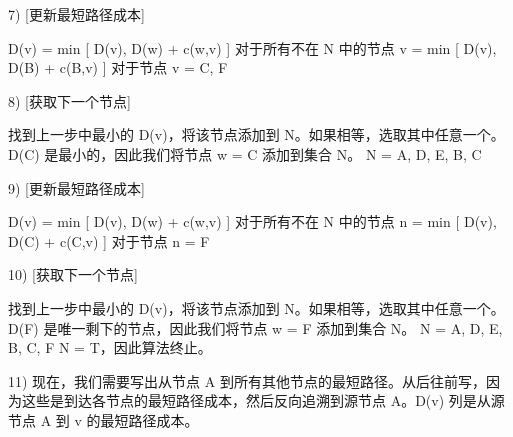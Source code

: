 \documentclass[oneside,UTF8]{ctexart}
\numberwithin{figure}{section} %
\begin{document}
7) [更新最短路径成本]

D(v) = min [ D(v), D(w) + c(w,v) ] 对于所有不在 N 中的节点 v
= min [ D(v), D(B) + c(B,v) ] 对于节点 v = C, F

8) [获取下一个节点]

找到上一步中最小的 D(v)，将该节点添加到 N。如果相等，选取其中任意一个。
D(C) 是最小的，因此我们将节点 w = C 添加到集合 N。
N = { A, D, E, B, C}

9) [更新最短路径成本]

D(v) = min [ D(v), D(w) + c(w,v) ] 对于所有不在 N 中的节点 n
= min [ D(v), D(C) + c(C,v) ] 对于节点 n = F

10) [获取下一个节点]

找到上一步中最小的 D(v)，将该节点添加到 N。如果相等，选取其中任意一个。
D(F) 是唯一剩下的节点，因此我们将节点 w = F 添加到集合 N。
N = { A, D, E, B, C, F }
N = T，因此算法终止。

11) 现在，我们需要写出从节点 A 到所有其他节点的最短路径。从后往前写，因为这些是到达各节点的最短路径成本，然后反向追溯到源节点 A。D(v) 列是从源节点 A 到 v 的最短路径成本。
\end{document}
